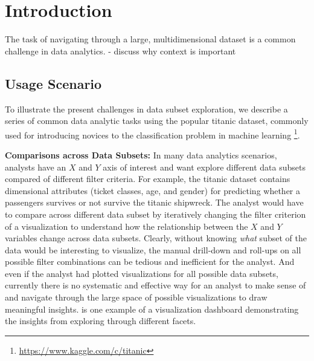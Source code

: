 \section{Introduction}
\par The task of navigating through a large, multidimensional dataset is a common challenge in data analytics. %
- discuss why context is important 
\subsection{Usage Scenario}
\par To illustrate the present challenges in data subset exploration, we describe a series of common data analytic tasks using the popular titanic dataset, commonly used for introducing novices to the classification problem in machine learning \footnote{\url{https://www.kaggle.com/c/titanic}}.

\textbf{Comparisons across Data Subsets:} In many data analytics scenarios, analysts have an $X$ and $Y$ axis of interest and want explore different data subsets compared of different filter criteria. For example, the titanic dataset contains dimensional attributes (ticket classes, age, and gender) for predicting whether a passengers survives or not survive the titanic shipwreck. The analyst would have to compare across different data subset by iteratively changing the filter criterion of a visualization to understand how the relationship between the $X$ and $Y$ variables change across data subsets.
Clearly, without knowing \textit{what} subset of the data would be interesting to visualize, the manual drill-down and roll-ups on all possible filter combinations can be tedious and inefficient for the analyst. And even if the analyst had plotted visualizations for all possible data subsets, currently there is no systematic and effective way for an analyst to make sense of and navigate through the large space of possible visualizations to draw meaningful insights. \cite{anand} is one example of a visualization dashboard demonstrating the insights from exploring through different facets.

